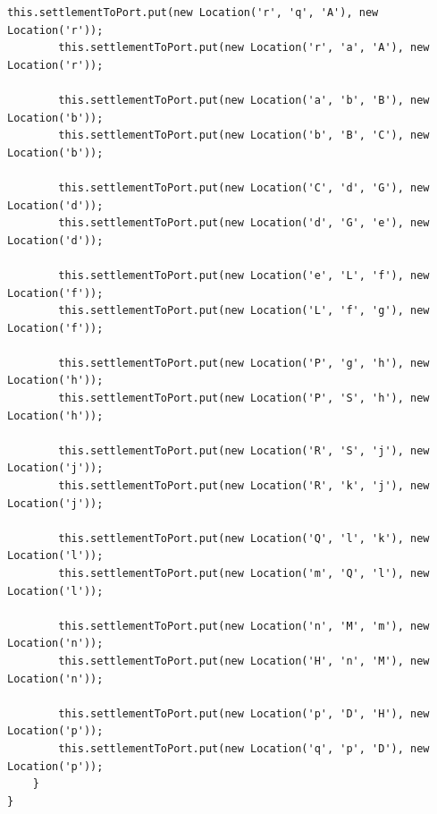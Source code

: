 \documentclass{fank1basedocument}
\begin{document}
\begin{lstlisting}[style=javacode,language=myJava]
		this.settlementToPort.put(new Location('r', 'q', 'A'), new Location('r'));
		this.settlementToPort.put(new Location('r', 'a', 'A'), new Location('r'));

		this.settlementToPort.put(new Location('a', 'b', 'B'), new Location('b'));
		this.settlementToPort.put(new Location('b', 'B', 'C'), new Location('b'));

		this.settlementToPort.put(new Location('C', 'd', 'G'), new Location('d'));
		this.settlementToPort.put(new Location('d', 'G', 'e'), new Location('d'));

		this.settlementToPort.put(new Location('e', 'L', 'f'), new Location('f'));
		this.settlementToPort.put(new Location('L', 'f', 'g'), new Location('f'));

		this.settlementToPort.put(new Location('P', 'g', 'h'), new Location('h'));
		this.settlementToPort.put(new Location('P', 'S', 'h'), new Location('h'));

		this.settlementToPort.put(new Location('R', 'S', 'j'), new Location('j'));
		this.settlementToPort.put(new Location('R', 'k', 'j'), new Location('j'));

		this.settlementToPort.put(new Location('Q', 'l', 'k'), new Location('l'));
		this.settlementToPort.put(new Location('m', 'Q', 'l'), new Location('l'));

		this.settlementToPort.put(new Location('n', 'M', 'm'), new Location('n'));
		this.settlementToPort.put(new Location('H', 'n', 'M'), new Location('n'));

		this.settlementToPort.put(new Location('p', 'D', 'H'), new Location('p'));
		this.settlementToPort.put(new Location('q', 'p', 'D'), new Location('p'));
	}
}
\end{lstlisting}
\end{document}
